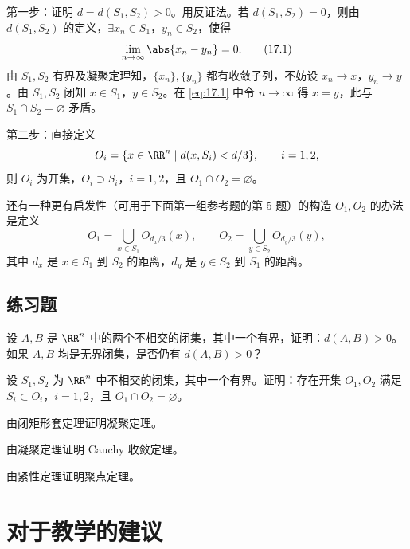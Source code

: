 \begin{xproof}
第一步：证明 $d=d(S_1,S_2)>0$。用反证法。若 $d(S_1,S_2)=0$，则由 $d(S_1,S_2)$ 的定义，$\exists x_n\in S_1$，$y_n\in S_2$，使得
\begin{equation}
  \lim_{n\to\infty}\abs{x_n-y_n}=0.
  \tag{17.1}
  \label{eq:17.1}
\end{equation}
由 $S_1,S_2$ 有界及凝聚定理知，$\{x_n\},\{y_n\}$ 都有收敛子列，不妨设 $x_n\to x$，$y_n\to y$。由 $S_1,S_2$ 闭知 $x\in S_1$，$y\in S_2$。在 \eqref{eq:17.1} 中令 $n\to\infty$ 得 $x=y$，此与 $S_1\cap S_2=\varnothing$ 矛盾。

第二步：直接定义
\[
  O_i=\{x\in\RR^n\mid d(x,S_i)<d/3\},\qquad i=1,2,
\]
则 $O_i$ 为开集，$O_i\supset S_i$，$i=1,2$，且 $O_1\cap O_2=\varnothing$。

还有一种更有启发性（可用于下面第一组参考题的第 5 题）的构造 $O_1,O_2$ 的办法是定义
\[
  O_1=\bigcup_{x\in S_1}O_{d_x/3}(x),\qquad
  O_2=\bigcup_{y\in S_2}O_{d_y/3}(y),
\]
其中 $d_x$ 是 $x\in S_1$ 到 $S_2$ 的距离，$d_y$ 是 $y\in S_2$ 到 $S_1$ 的距离。
\end{xproof}

\subsection{练习题}
\begin{xexercise}[1]
设 $A,B$ 是 $\RR^n$ 中的两个不相交的闭集，其中一个有界，证明：$d(A,B)>0$。如果 $A,B$ 均是无界闭集，是否仍有 $d(A,B)>0$？
\end{xexercise}

\begin{xexercise}[2]
设 $S_1,S_2$ 为 $\RR^n$ 中不相交的闭集，其中一个有界。证明：存在开集 $O_1,O_2$ 满足 $S_i\subset O_i$，$i=1,2$，且 $O_1\cap O_2=\varnothing$。
\end{xexercise}

\begin{xexercise}[3]
由闭矩形套定理证明凝聚定理。
\end{xexercise}

\begin{xexercise}[4]
由凝聚定理证明 Cauchy 收敛定理。
\end{xexercise}

\begin{xexercise}[5]
由紧性定理证明聚点定理。
\end{xexercise}

\section{对于教学的建议}

